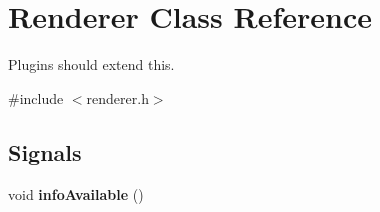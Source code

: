 \hypertarget{classRenderer}{
\section{\-Renderer \-Class \-Reference}
\label{classRenderer}
}


\-Plugins should extend this.  




{\ttfamily \#include $<$renderer.\-h$>$}

\subsection*{\-Signals}
\begin{DoxyCompactItemize}
\item 
\hypertarget{classRenderer_a7856138383e97e4ac7fd8964f5592ec6}{
void {\bfseries info\-Available} ()}
\label{classRenderer_a7856138383e97e4ac7fd8964f5592ec6}

\end{DoxyCompactItemize}
